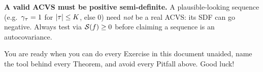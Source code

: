 \begin{pitfall}
\textbf{A valid ACVS must be positive semi-definite.} A plausible-looking
sequence (e.g.\ $\gamma_\tau=1$ for $\left\lvert \tau \right\rvert\le K$, else $0$) need \emph{not} be
a real ACVS: its SDF can go negative. Always test via $\mathcal{S}(f)\ge0$ before
claiming a sequence is an autocovariance.
\end{pitfall}

\begin{center}
\begin{tcolorbox}[width=0.9\textwidth,colback=green!5!white,colframe=green!48!black,
  arc=2mm,boxrule=0.8pt,halign=center,fontupper=\large\bfseries]
You are ready when you can do every \textcolor{cyan!55!black}{Exercise} in this
document unaided, name the tool behind every \textcolor{red!62!black}{Theorem},
and avoid every \textcolor{red!70!black}{Pitfall} above. Good luck!
\end{tcolorbox}
\end{center}
